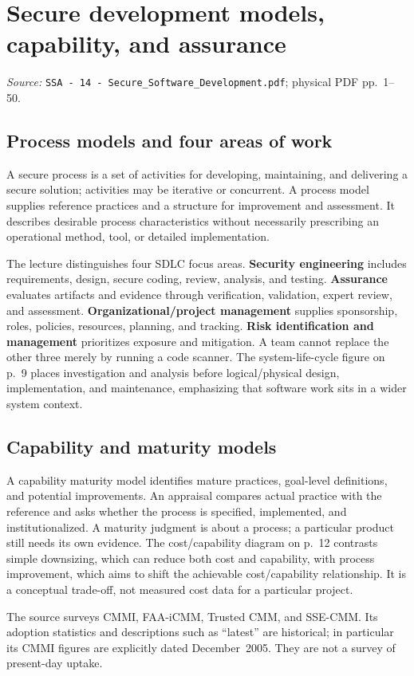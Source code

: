 \documentclass[11pt,a4paper]{article}
\newcommand{\currentmodule}{Contents}
\newcommand{\source}[2]{\textcolor{muted}{\small\textit{Source:} \nolinkurl{#1}; physical PDF pp.~#2.}\par\medskip}
\newcommand{\module}[2]{\par\Needspace{8\baselineskip}\gdef\currentmodule{#1}\section{#1}\label{#2}}
\numberwithin{figure}{section}
\begin{document}
\module{Secure development models, capability, and assurance}{sec:models}
\source{SSA - 14 - Secure_Software_Development.pdf}{1--50}
\subsection{Process models and four areas of work}
A secure process is a set of activities for developing, maintaining, and delivering a secure solution; activities may be iterative or concurrent. A process model supplies reference practices and a structure for improvement and assessment. It describes desirable process characteristics without necessarily prescribing an operational method, tool, or detailed implementation.

The lecture distinguishes four SDLC focus areas. \textbf{Security engineering} includes requirements, design, secure coding, review, analysis, and testing. \textbf{Assurance} evaluates artifacts and evidence through verification, validation, expert review, and assessment. \textbf{Organizational/project management} supplies sponsorship, roles, policies, resources, planning, and tracking. \textbf{Risk identification and management} prioritizes exposure and mitigation. A team cannot replace the other three merely by running a code scanner. The system-life-cycle figure on p.~9 places investigation and analysis before logical/physical design, implementation, and maintenance, emphasizing that software work sits in a wider system context.

\subsection{Capability and maturity models}
A capability maturity model identifies mature practices, goal-level definitions, and potential improvements. An appraisal compares actual practice with the reference and asks whether the process is specified, implemented, and institutionalized. A maturity judgment is about a process; a particular product still needs its own evidence. The cost/capability diagram on p.~12 contrasts simple downsizing, which can reduce both cost and capability, with process improvement, which aims to shift the achievable cost/capability relationship. It is a conceptual trade-off, not measured cost data for a particular project.

The source surveys CMMI, FAA-iCMM, Trusted CMM, and SSE-CMM. Its adoption statistics and descriptions such as ``latest'' are historical; in particular its CMMI figures are explicitly dated December~2005. They are not a survey of present-day uptake.
\end{document}
